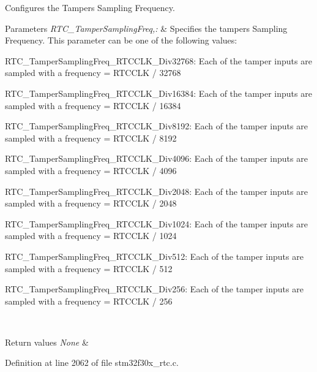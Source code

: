 Configures the Tampers Sampling Frequency. 


\begin{DoxyParams}{Parameters}
{\em R\-T\-C\-\_\-\-Tamper\-Sampling\-Freq,\-:} & Specifies the tampers Sampling Frequency. This parameter can be one of the following values\-: \begin{DoxyItemize}
\item R\-T\-C\-\_\-\-Tamper\-Sampling\-Freq\-\_\-\-R\-T\-C\-C\-L\-K\-\_\-\-Div32768\-: Each of the tamper inputs are sampled with a frequency = R\-T\-C\-C\-L\-K / 32768 \item R\-T\-C\-\_\-\-Tamper\-Sampling\-Freq\-\_\-\-R\-T\-C\-C\-L\-K\-\_\-\-Div16384\-: Each of the tamper inputs are sampled with a frequency = R\-T\-C\-C\-L\-K / 16384 \item R\-T\-C\-\_\-\-Tamper\-Sampling\-Freq\-\_\-\-R\-T\-C\-C\-L\-K\-\_\-\-Div8192\-: Each of the tamper inputs are sampled with a frequency = R\-T\-C\-C\-L\-K / 8192 \item R\-T\-C\-\_\-\-Tamper\-Sampling\-Freq\-\_\-\-R\-T\-C\-C\-L\-K\-\_\-\-Div4096\-: Each of the tamper inputs are sampled with a frequency = R\-T\-C\-C\-L\-K / 4096 \item R\-T\-C\-\_\-\-Tamper\-Sampling\-Freq\-\_\-\-R\-T\-C\-C\-L\-K\-\_\-\-Div2048\-: Each of the tamper inputs are sampled with a frequency = R\-T\-C\-C\-L\-K / 2048 \item R\-T\-C\-\_\-\-Tamper\-Sampling\-Freq\-\_\-\-R\-T\-C\-C\-L\-K\-\_\-\-Div1024\-: Each of the tamper inputs are sampled with a frequency = R\-T\-C\-C\-L\-K / 1024 \item R\-T\-C\-\_\-\-Tamper\-Sampling\-Freq\-\_\-\-R\-T\-C\-C\-L\-K\-\_\-\-Div512\-: Each of the tamper inputs are sampled with a frequency = R\-T\-C\-C\-L\-K / 512 \item R\-T\-C\-\_\-\-Tamper\-Sampling\-Freq\-\_\-\-R\-T\-C\-C\-L\-K\-\_\-\-Div256\-: Each of the tamper inputs are sampled with a frequency = R\-T\-C\-C\-L\-K / 256 \end{DoxyItemize}
\\
\hline
\end{DoxyParams}

\begin{DoxyRetVals}{Return values}
{\em None} & \\
\hline
\end{DoxyRetVals}


Definition at line 2062 of file stm32f30x\-\_\-rtc.\-c.

